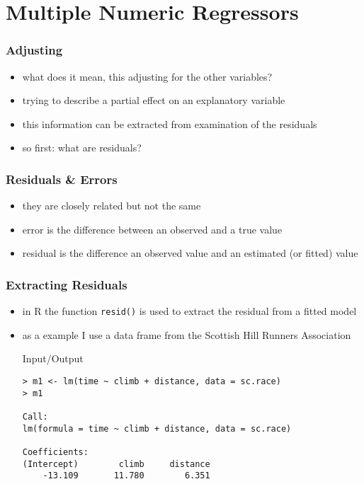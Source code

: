 \section{Multiple Numeric Regressors}
\begin{frame}\frametitle{Adjusting}
  \begin{itemize}
  \item what does it mean, this adjusting for the other variables?
  \item trying to describe a partial effect on an explanatory variable
  \item this information can be extracted from examination of the residuals
  \item so first: what are residuals?
  \end{itemize}
\end{frame}


\begin{frame}\frametitle{Residuals \& Errors}
  \begin{itemize}
  \item they are closely related but not the same
  \item error is the difference between an observed and a true value
  \item residual is the difference an observed value and an estimated (or fitted) value
  \end{itemize}
\end{frame}


\begin{frame}[fragile]\frametitle{Extracting Residuals}
  \begin{itemize}
  \item in R the function \texttt{resid()} is used to extract the residual from a fitted model
  \item as a example I use a data frame from the Scottish Hill Runners Association
    \begin{exampleblock}{Input/Output}\footnotesize
\begin{verbatim}
> m1 <- lm(time ~ climb + distance, data = sc.race)
> m1

Call:
lm(formula = time ~ climb + distance, data = sc.race)

Coefficients:
(Intercept)        climb     distance  
    -13.109       11.780        6.351  
\end{verbatim}
    \end{exampleblock}

  \end{itemize}
\end{frame}


